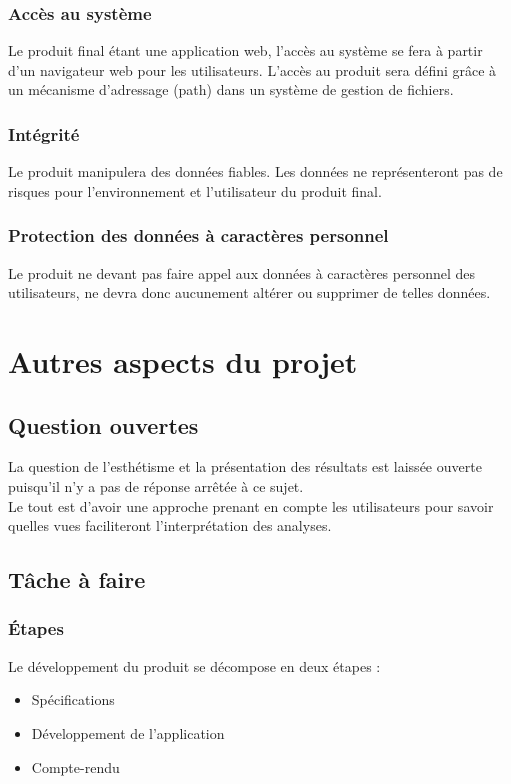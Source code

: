 			\subsubsection{Accès au système}
			Le produit final étant une application web, l'accès au système se fera à partir d'un navigateur web pour les utilisateurs. L'accès au produit sera défini grâce à un mécanisme d'adressage (path) dans un système de gestion de fichiers.
			\subsubsection{Intégrité}
			Le produit manipulera des données fiables. Les données ne représenteront pas de risques pour l'environnement et l'utilisateur du produit final.
			\subsubsection{Protection des données à caractères personnel}
			Le produit ne devant pas faire appel aux données à caractères personnel des utilisateurs, ne devra donc aucunement altérer ou supprimer de telles données.		
		
	\section{Autres aspects du projet}
		\subsection{Question ouvertes}
			La question de l'esthétisme et la présentation des résultats est laissée ouverte puisqu'il n'y a pas de réponse arrêtée à ce sujet.\\
			Le tout est d'avoir une approche prenant en compte les utilisateurs pour savoir quelles vues faciliteront l'interprétation des analyses.

		\subsection{Tâche à faire}
			\subsubsection{Étapes}
			Le développement du produit se décompose en deux étapes :
				\begin{itemize}
				\item Spécifications
				\item Développement de l'application
				\item Compte-rendu
				\end{itemize}
				

